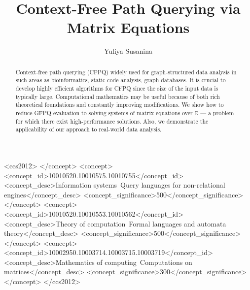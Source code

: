 \documentclass[sigconf]{acmart}
\begin{document}
\fancyhead{}

\title{Context-Free Path Querying via Matrix Equations}

\author{Yuliya Susanina}





\begin{abstract}
  Context-free path querying (CFPQ) widely used for graph-structured data analysis in such areas as bioinformatics, static code analysis, graph databases.
  It is crucial to develop highly efficient algorithms for CFPQ since the size of the input data is typically large.
  Computational mathematics may be useful because of both rich theoretical foundations and constantly improving modifications.
  We show how to reduce GFPQ evaluation to solving systems of matrix equations over $\mathbb{R}$ --- a problem for which there exist high-performance solutions.
  Also, we demonstrate the applicability of our approach to real-world data analysis.
\end{abstract}

\begin{CCSXML}
<ccs2012>
 </concept>
 <concept>
  <concept_id>10010520.10010575.10010755</concept_id>
  <concept_desc>Information systems~Query languages for non-relational engines</concept_desc>
  <concept_significance>500</concept_significance>
 </concept>
 <concept>
  <concept_id>10010520.10010553.10010562</concept_id>
  <concept_desc>Theory of computation~Formal languages and automata theory</concept_desc>
  <concept_significance>500</concept_significance>
 </concept>
 <concept>
  <concept_id>10002950.10003714.10003715.10003719</concept_id>
  <concept_desc>Mathematics of computing~Computations on matrices</concept_desc>
  <concept_significance>300</concept_significance>
  </concept>
</ccs2012>
\end{CCSXML}
\end{document}
